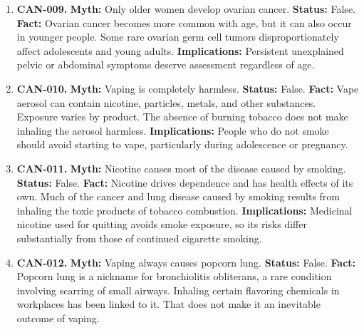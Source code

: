 \documentclass[11pt,oneside]{book}
\begin{document}
\begin{enumerate}[leftmargin=0pt,labelwidth=0pt,labelsep=0pt,itemindent=0pt]
\textbf{Status:} False.\newline
\textbf{Fact:} A Pap test samples cells from the cervix to look for changes that can lead to cervical cancer. It is not a reliable test for ovarian cancer. \cite{ref381}\newline
\textbf{Implications:} Discuss persistent new bloating, pelvic discomfort, or feeling full unusually quickly even if a recent Pap result was normal.
\item[] \textbf{CAN-009.} \textbf{Myth:} Only older women develop ovarian cancer.\newline
\textbf{Status:} False.\newline
\textbf{Fact:} Ovarian cancer becomes more common with age, but it can also occur in younger people. Some rare ovarian germ cell tumors disproportionately affect adolescents and young adults. \cite{ref382,ref381}\newline
\textbf{Implications:} Persistent unexplained pelvic or abdominal symptoms deserve assessment regardless of age.
\item[] \textbf{CAN-010.} \textbf{Myth:} Vaping is completely harmless.\newline
\textbf{Status:} False.\newline
\textbf{Fact:} Vape aerosol can contain nicotine, particles, metals, and other substances. Exposure varies by product. The absence of burning tobacco does not make inhaling the aerosol harmless. \cite{ref383,ref278}\newline
\textbf{Implications:} People who do not smoke should avoid starting to vape, particularly during adolescence or pregnancy.
\item[] \textbf{CAN-011.} \textbf{Myth:} Nicotine causes most of the disease caused by smoking.\newline
\textbf{Status:} False.\newline
\textbf{Fact:} Nicotine drives dependence and has health effects of its own. Much of the cancer and lung disease caused by smoking results from inhaling the toxic products of tobacco combustion. \cite{ref278,ref384}\newline
\textbf{Implications:} Medicinal nicotine used for quitting avoids smoke exposure, so its risks differ substantially from those of continued cigarette smoking.
\item[] \textbf{CAN-012.} \textbf{Myth:} Vaping always causes popcorn lung.\newline
\textbf{Status:} False.\newline
\textbf{Fact:} Popcorn lung is a nickname for bronchiolitis obliterans, a rare condition involving scarring of small airways. Inhaling certain flavoring chemicals in workplaces has been linked to it. That does not make it an inevitable outcome of vaping. \cite{ref278,ref383}\newline

\end{enumerate}
\end{document}
